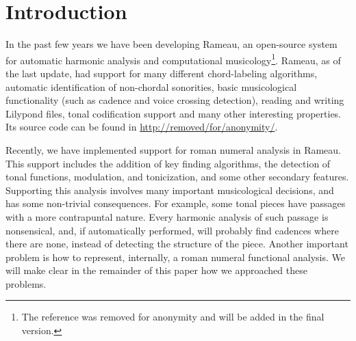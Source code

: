
\section{Introduction}
\label{sec:introduction}

In the past few years we have been developing Rameau, an open-source
system for automatic harmonic analysis and computational
musicology\footnote{The reference was removed for anonymity and will
  be added in the final version.}. Rameau, as of the last update, had
support for many different chord-labeling algorithms, automatic
identification of non-chordal sonorities, basic musicological
functionality (such as cadence and voice crossing detection), reading
and writing Lilypond \cite{nienhuys.ea08:lilypond} files, tonal
codification support and many other interesting properties. Its source
code can be found in \url{http://removed/for/anonymity/}.

Recently, we have implemented support for roman numeral analysis in
Rameau. This support includes the addition of key finding algorithms,
the detection of tonal functions, modulation, and tonicization, and
some other secondary features. Supporting this analysis involves many
important musicological decisions, and has some non-trivial
consequences. For example, some tonal pieces have passages with a more
contrapuntal nature. Every harmonic analysis of such passage is
nonsensical, and, if automatically performed, will probably find
cadences where there are none, instead of detecting the structure of
the piece.  Another important problem is how to represent, internally,
a roman numeral functional analysis. We will make clear in the
remainder of this paper how we approached these problems.


